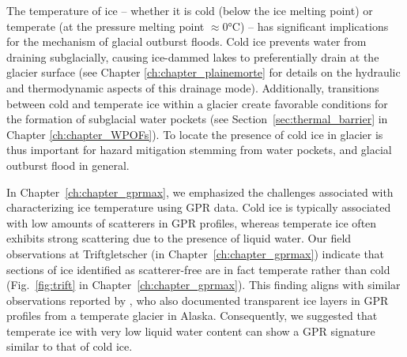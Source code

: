 The temperature of ice -- whether it is cold (below the ice melting point) or temperate (at the pressure melting point $\approx$0°C) -- has significant implications for the mechanism of glacial outburst floods. Cold ice prevents water from draining subglacially, causing ice-dammed lakes to preferentially drain at the glacier surface (see Chapter \ref{ch:chapter_plainemorte} for details on the hydraulic and thermodynamic aspects of this drainage mode). Additionally, transitions between cold and temperate ice within a glacier create favorable conditions for the formation of subglacial water pockets (see Section~\ref{sec:thermal_barrier} in Chapter \ref{ch:chapter_WPOFs}). To locate the presence of cold ice in glacier is thus important for hazard mitigation stemming from water pockets, and glacial outburst flood in general. 

In Chapter~\ref{ch:chapter_gprmax}, we emphasized the challenges associated with characterizing ice temperature using GPR data. Cold ice is typically associated with low amounts of scatterers in GPR profiles, whereas temperate ice often exhibits strong scattering due to the presence of liquid water. Our field observations at Triftgletscher (in Chapter~\ref{ch:chapter_gprmax}) indicate that sections of ice identified as scatterer-free are in fact temperate rather than cold (Fig.~\ref{fig:trift} in Chapter~\ref{ch:chapter_gprmax}). This finding aligns with similar observations reported by \cite{Brown&al2009}, who also documented transparent ice layers in GPR profiles from a temperate glacier in Alaska. Consequently, we suggested that temperate ice with very low liquid water content can show a GPR signature similar to that of cold ice. 

